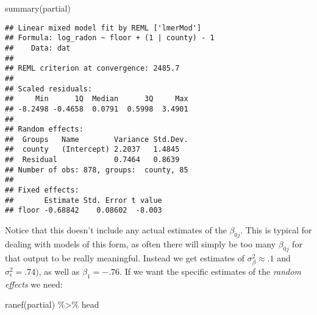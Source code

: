 \documentclass[
]{article}
\newenvironment{Shaded}{\begin{snugshade}}{\end{snugshade}}
\newcommand{\FunctionTok}[1]{\textcolor[rgb]{0.00,0.00,0.00}{#1}}
\newcommand{\NormalTok}[1]{#1}
\newcommand{\SpecialCharTok}[1]{\textcolor[rgb]{0.00,0.00,0.00}{#1}}
\begin{document}
\begin{Shaded}
\begin{Highlighting}[]
\FunctionTok{summary}\NormalTok{(partial)}
\end{Highlighting}
\end{Shaded}

\begin{verbatim}
## Linear mixed model fit by REML ['lmerMod']
## Formula: log_radon ~ floor + (1 | county) - 1
##    Data: dat
## 
## REML criterion at convergence: 2485.7
## 
## Scaled residuals: 
##     Min      1Q  Median      3Q     Max 
## -8.2498 -0.4658  0.0791  0.5998  3.4901 
## 
## Random effects:
##  Groups   Name        Variance Std.Dev.
##  county   (Intercept) 2.2037   1.4845  
##  Residual             0.7464   0.8639  
## Number of obs: 878, groups:  county, 85
## 
## Fixed effects:
##       Estimate Std. Error t value
## floor -0.68842    0.08602  -8.003
\end{verbatim}

Notice that this doesn't include any actual estimates of the
\(\beta_{0j}\). This is typical for dealing with models of this form, as
often there will simply be too many \(\beta_{0j}\) for that output to be
really meaningful. Instead we get estimates of
\(\sigma^2_{\beta}\approx .1\) and \(\sigma^2_{\epsilon} = .74)\), as
well as \(\beta_1=-.76\). If we want the specific estimates of the
\emph{random effects} we need:

\begin{Shaded}
\begin{Highlighting}[]
\FunctionTok{ranef}\NormalTok{(partial) }\SpecialCharTok{\%\textgreater{}\%}\NormalTok{ head}
\end{Highlighting}
\end{Shaded}
\end{document}
